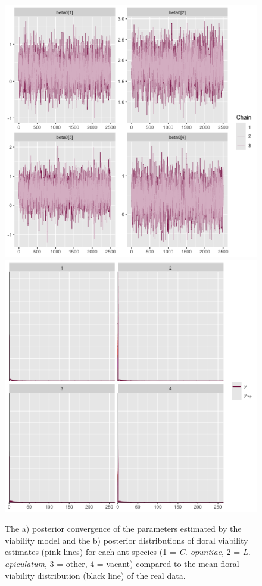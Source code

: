 \documentclass[11pt]{article}
\begin{document}
\begin{figure}
\includegraphics[width = 0.45\linewidth]{Figures/viab_conv.png}
\includegraphics[width=0.45\linewidth]{Figures/viab_post.png}
\caption{The a) posterior convergence of the parameters estimated by the viability model and the b) posterior distributions of floral viability estimates (pink lines) for each ant species (1 = \textit{C. opuntiae}, 2 = \textit{L. apiculatum}, 3 = other, 4 = vacant) compared to the mean floral viability distribution (black line) of the real data.}
\label{fig:Viab_post}
\end{figure}
\end{document}
